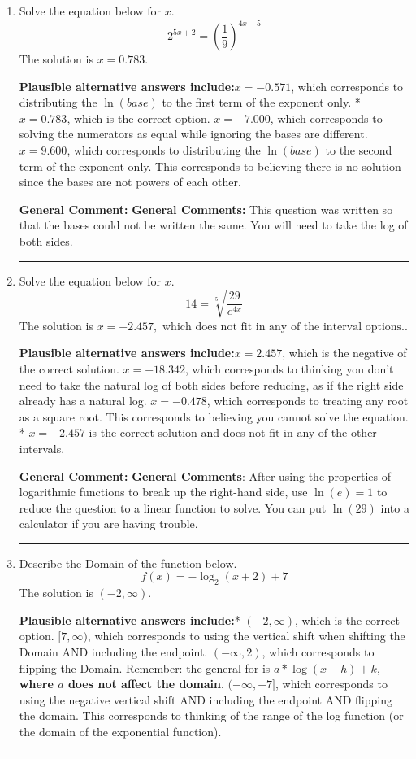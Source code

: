 \documentclass{extbook}[14pt]
\newcommand{\litem}[1]{\item #1

\rule{\textwidth}{0.4pt}}
\begin{document}
\begin{enumerate}\litem{
Solve the equation below for $x$.
\[ 2^{5x+2} = \left(\frac{1}{9}\right)^{4x-5} \]The solution is \( x = 0.783 \).\begin{enumerate}[label=\Alph*.]
\textbf{Plausible alternative answers include:}$x = -0.571$, which corresponds to distributing the $\ln(base)$ to the first term of the exponent only.
* $x = 0.783$, which is the correct option.
$x = -7.000$, which corresponds to solving the numerators as equal while ignoring the bases are different.
$x = 9.600$, which corresponds to distributing the $\ln(base)$ to the second term of the exponent only.
This corresponds to believing there is no solution since the bases are not powers of each other.
\end{enumerate}

\textbf{General Comment:} \textbf{General Comments:} This question was written so that the bases could not be written the same. You will need to take the log of both sides.
}
\litem{
Solve the equation below for $x$.
\[  14 = \sqrt[5]{\frac{29}{e^{4x}}} \]The solution is \( x = -2.457, \text{ which does not fit in any of the interval options.} \).\begin{enumerate}[label=\Alph*.]
\textbf{Plausible alternative answers include:}$x = 2.457$, which is the negative of the correct solution.
$x = -18.342$, which corresponds to thinking you don't need to take the natural log of both sides before reducing, as if the right side already has a natural log.
$x = -0.478$, which corresponds to treating any root as a square root.
This corresponds to believing you cannot solve the equation.
* $x = -2.457$ is the correct solution and does not fit in any of the other intervals.
\end{enumerate}

\textbf{General Comment:} \textbf{General Comments}: After using the properties of logarithmic functions to break up the right-hand side, use $\ln(e) = 1$ to reduce the question to a linear function to solve. You can put $\ln(29)$ into a calculator if you are having trouble.
}
\litem{
Describe the Domain of the function below.
\[ f(x) = -\log_2{(x+2)}+7 \]The solution is \( (-2, \infty) \).\begin{enumerate}[label=\Alph*.]
\textbf{Plausible alternative answers include:}* $(-2, \infty)$, which is the correct option.
$[7, \infty)$, which corresponds to using the vertical shift when shifting the Domain AND including the endpoint.
$(-\infty, 2)$, which corresponds to flipping the Domain. Remember: the general for is $a*\log(x-h)+k$, \textbf{where $a$ does not affect the domain}.
$(-\infty, -7]$, which corresponds to using the negative vertical shift AND including the endpoint AND flipping the domain.
This corresponds to thinking of the range of the log function (or the domain of the exponential function).
\end{enumerate}

}
\end{enumerate}
\end{document}
